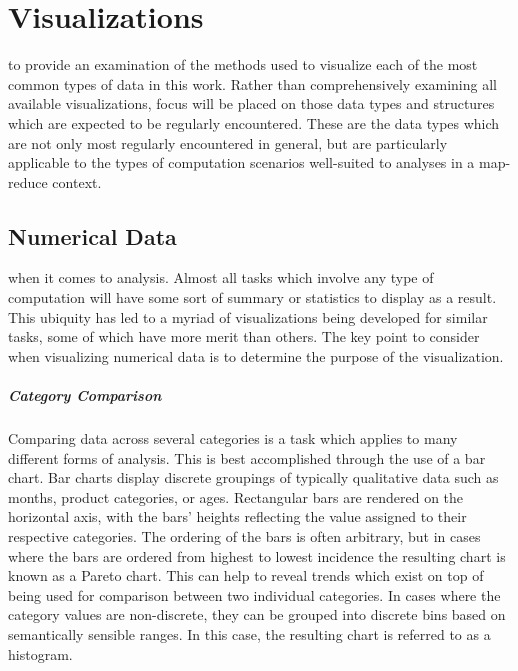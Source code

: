 \chapter{Visualizations}
\label{sec:visualizations}
 to provide an examination of the methods used to visualize each of the most common types of data in this work. Rather than comprehensively examining all available visualizations, focus will be placed on those data types and structures which are expected to be regularly encountered. These are the data types which are not only most regularly encountered in general, but are particularly applicable to the types of computation scenarios well-suited to analyses in a map-reduce context. 
 

\section{Numerical Data}
\label{sec:numerical_data}
 when it comes to analysis. Almost all tasks which involve any type of computation will have some sort of summary  or statistics to display as a result. This ubiquity has led to a myriad of visualizations being developed for similar tasks, some of which have more merit than others. The key point to consider when visualizing numerical data is to determine the purpose of the visualization. 

\paragraph{Category Comparison}
Comparing data across several categories is a task which applies to many different forms of analysis. This is best accomplished through the use of a bar chart. Bar charts display discrete groupings of typically qualitative data such as months, product categories, or ages. Rectangular bars are rendered on the horizontal axis, with the bars' heights reflecting the value assigned to their respective categories. The ordering of the bars is often arbitrary, but in cases where the bars are ordered from highest to lowest incidence the resulting chart is known as a Pareto chart. This can help to reveal trends which exist on top of being used for comparison between two individual categories. In cases where the category values are non-discrete, they can be grouped into discrete bins based on semantically sensible ranges. In this case, the resulting chart is referred to as a histogram.  

